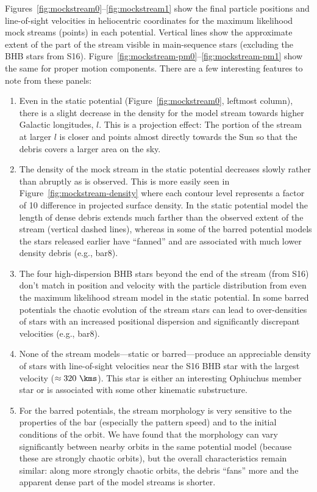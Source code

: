 \documentclass[letterpaper,12pt,preprint]{aastex}
\renewcommand{\changes}[1]{#1}
\begin{document}
Figures~\ref{fig:mockstream0}--\ref{fig:mockstream1} show the final particle positions and line-of-sight velocities in heliocentric coordinates for the maximum likelihood mock streams (points) in each potential. Vertical lines show the approximate extent of the part of the stream visible in main-sequence stars (excluding the BHB stars from S16). \changes{Figure~\ref{fig:mockstream-pm0}--\ref{fig:mockstream-pm1} show the same for proper motion components.} There are a few interesting features to note from these panels:
\begin{enumerate}
	\item Even in the static potential (Figure~\ref{fig:mockstream0}, leftmost column), there is a slight decrease in the density for the model stream towards higher Galactic longitudes, $l$. This is a projection effect: The portion of the stream at larger $l$ is closer and points almost directly towards the Sun so that the debris covers a larger area on the sky.
	\item The density of the mock stream in the static potential decreases slowly rather than abruptly as is observed. This is more easily seen in Figure~\ref{fig:mockstream-density} where each contour level represents a factor of 10 difference in projected surface density. In the static potential model the length of dense debris extends much farther than the observed extent of the stream (vertical dashed lines), whereas in some of the barred potential models the stars released earlier have ``fanned'' and are associated with much lower density debris (e.g., bar8).
	\item The four high-dispersion BHB stars beyond the end of the stream (from S16) don't match in position and velocity with the particle distribution from even the maximum likelihood stream model in the static potential. In some barred potentials the chaotic evolution of the stream stars can lead to over-densities of stars with an increased positional dispersion and significantly discrepant velocities (e.g., bar8).
	\item None of the stream models---static or barred---produce an appreciable density of stars with line-of-sight velocities near the S16 BHB star with the largest velocity ($\approx 320~\kms$). This star is either an interesting Ophiuchus member star or is associated with some other kinematic substructure.
	\item For the barred potentials, the stream morphology is very sensitive to the properties of the bar (especially the pattern speed) and to the initial conditions of the orbit. We have found that the morphology can vary significantly between nearby orbits in the same potential model (because these are strongly chaotic orbits), but the overall characteristics remain similar: along more strongly chaotic orbits, the debris ``fans'' more and the apparent dense part of the model streams is shorter.
\end{enumerate}
\end{document}
